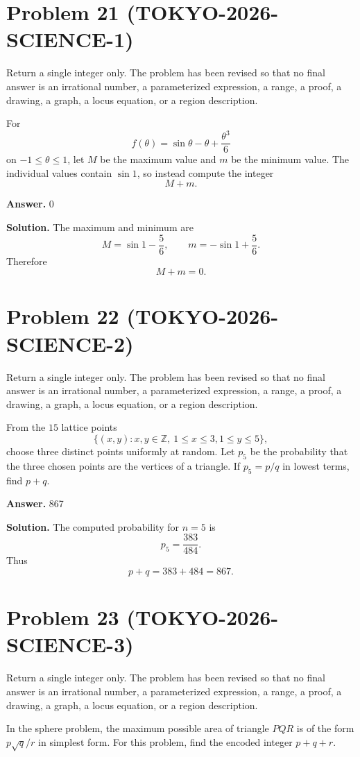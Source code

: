 \documentclass[11pt]{article}
\begin{document}
\section*{Problem 21 (TOKYO-2026-SCIENCE-1)}

Return a single integer only. The problem has been revised so that no final answer is an irrational number, a parameterized expression, a range, a proof, a drawing, a graph, a locus equation, or a region description.

For
\[
f(\theta)=\sin\theta-\theta+\frac{\theta^3}{6}
\]
on \(-1\le\theta\le1\), let \(M\) be the maximum value and \(m\) be the minimum
value. The individual values contain \(\sin1\), so instead compute the integer
\[
M+m.
\]


\textbf{Answer.} 0


\textbf{Solution.}
The maximum and minimum are
\[
M=\sin1-\frac56,
\qquad
m=-\sin1+\frac56.
\]
Therefore
\[
M+m=0.
\]


\section*{Problem 22 (TOKYO-2026-SCIENCE-2)}

Return a single integer only. The problem has been revised so that no final answer is an irrational number, a parameterized expression, a range, a proof, a drawing, a graph, a locus equation, or a region description.

From the \(15\) lattice points
\[
\{(x,y):x,y\in\mathbb Z,\ 1\le x\le3,
1\le y\le5\},
\]
choose three distinct points uniformly at random. Let \(p_5\) be the probability
that the three chosen points are the vertices of a triangle. If
\(p_5=p/q\) in lowest terms, find \(p+q\).


\textbf{Answer.} 867


\textbf{Solution.}
The computed probability for \(n=5\) is
\[
p_5=\frac{383}{484}.
\]
Thus
\[
p+q=383+484=867.
\]


\section*{Problem 23 (TOKYO-2026-SCIENCE-3)}

Return a single integer only. The problem has been revised so that no final answer is an irrational number, a parameterized expression, a range, a proof, a drawing, a graph, a locus equation, or a region description.

In the sphere problem, the maximum possible area of triangle \(PQR\) is of the
form \(p\sqrt q/r\) in simplest form. For this problem, find the encoded integer
\(p+q+r\).
\end{document}

